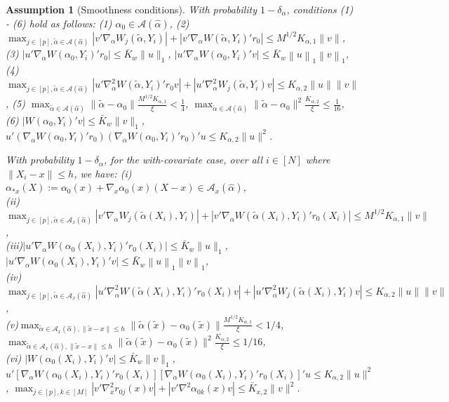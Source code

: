 \documentclass[10pt,a4paper]{amsart}
\newtheorem{assumption}{Assumption}
\newcommand{\norm}[1]{\left\lVert #1 \right\rVert}
\begin{document}
\begin{assumption}[Smoothness conditions]\label{ass:smoothness-assumptions}
With probability $1-\delta_\alpha$, conditions (1) - (6) hold as follows: (1) $\alpha_0\in\mathcal{A}(\hat{\alpha})$, (2) ${\displaystyle\max_{j\in [p], \tilde \alpha \in \mathcal{A}(\hat\alpha)}}|v'\nabla_\alpha W_j(\tilde \alpha,Y_i)|  +|v'\nabla_\alpha W(\tilde \alpha,Y_i)'r_0| \leq M^{1/2}K_{\alpha,1}\|v\|$, \\
(3) $|u'\nabla_{\alpha}W(\alpha_0,Y_i)'r_0|\leq\bar{K}_w\|u\|_1$, $|u'\nabla_{\alpha}W(\alpha_0,Y_i)'v|\leq \bar{K}_w\norm{u}_1\norm{v}_{1}$, \\
(4) $\displaystyle\max_{j \in [p], \tilde \alpha \in \mathcal{A}(\hat\alpha)}|u'\nabla_\alpha^2 W(\tilde\alpha,Y_i)'r_0v|+|u'\nabla_\alpha^2 W_j(\tilde\alpha,Y_i)v|\leq K_{\alpha,2}\|u\|\|v\|$, (5) ${\displaystyle \max_{\tilde\alpha \in \mathcal{A}(\hat\alpha)}}\|\tilde \alpha-\alpha_0\|\frac{M^{1/2}K_{\alpha,1}}{\xi}<\frac{1}{4}$, ${\displaystyle\max_{\tilde\alpha \in \mathcal{A}(\hat\alpha)}}\|\tilde\alpha-\alpha_0\|^2 \frac{K_{\alpha,2}}{\xi}\leq\frac{1}{16}$, (6) $|W(\alpha_0,Y_i)'v|\leq\bar{K}_w\|v\|_1$, $u'(\nabla_{\alpha}W(\alpha_0,Y_i)'r_0)(\nabla_{\alpha}W(\alpha_0,Y_i)'r_0)'u\leq K_{\alpha,2}\|u\|^2$.

\noindent With probability $1-\delta_\alpha$, for the with-covariate case, over all $i\in[N]$ where $\|X_i-x\|\leq h$, we have:
(i) {$\alpha_{*x}(X):=\alpha_0(x)+\nabla_x\alpha_0(x)(X-x) \in \mathcal{A}_x(\hat\alpha)$},\\
(ii) ${\displaystyle\max_{j\in [p], \tilde \alpha \in \mathcal{A}_x(\hat\alpha)}}|v'\nabla_\alpha W_j(\tilde \alpha(X_i),Y_i)|  +|v'\nabla_\alpha W(\tilde \alpha(X_i),Y_i)'r_0(X_i)| \leq M^{1/2}K_{\alpha,1}\|v\|$, \\
(iii)$|u'\nabla_{\alpha}W(\alpha_0(X_i),Y_i)'r_0(X_i)|\leq\bar{K}_w\|u\|_1$, $|u'\nabla_{\alpha}W(\alpha_0(X_i),Y_i)'v|\leq \bar{K}_w\norm{u}_1\norm{v}_{1}$,\\
(iv)$\displaystyle\max_{j \in [p], \tilde \alpha \in \mathcal{A}_x(\hat\alpha)}|u'\nabla_\alpha^2 W(\tilde\alpha(X_i),Y_i)'r_0(X_i)v|+|u'\nabla_\alpha^2 W_j(\tilde\alpha(X_i),Y_i)v|\leq K_{\alpha,2}\|u\|\|v\|$,\\
(v)${\displaystyle \max_{\tilde\alpha \in \mathcal{A}_x(\hat\alpha),\|\tilde x-x\|\leq h}}\|\tilde \alpha(\tilde x)-\alpha_0(\tilde x)\|\frac{M^{1/2}K_{\alpha,1}}{\xi}<1/4$,  ${\displaystyle \max_{\tilde\alpha \in \mathcal{A}_x(\hat\alpha),\|\tilde x-x\|\leq h}}\|\tilde \alpha(\tilde x)-\alpha_0(\tilde{x})\|^2 \frac{K_{\alpha,2}}{\xi}\leq1/16$,\\
(vi) $|W(\alpha_0(X_i),Y_i)'v|\leq\bar{K}_w\|v\|_1$, $u'[\nabla_{\alpha}W(\alpha_0(X_i),Y_i)'r_0(X_i)][\nabla_{\alpha}W(\alpha_0(X_i),Y_i)'r_0(X_i)]'u\leq K_{\alpha,2}\|u\|^2$, ${\displaystyle\max_{j\in [p], k\in[M]}}|v'\nabla_{x}^2 r_{0j}(x)v|+ |v'\nabla^2\alpha_{0k}(x)v|\leq \bar{K}_{x,2}\|v\|^2$.
\end{assumption}
\end{document}
